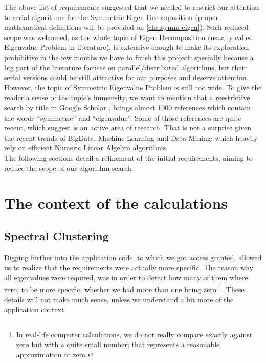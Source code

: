 The above list of requirements suggested that we needed to restrict
our attention to serial algorithms for the Symmetric Eigen
Decomposition (proper mathematical definitions will be provided on
\cref{cha:symm-eigen}). Such reduced scope was welcomed, as the whole
topic of Eigen Decomposition (usually called Eigenvalue Problem in
literature), is extensive enough to make its exploration prohibitive in
the few months we have to finish this project; specially because a big
part of the literature focuses on parallel/distributed algorithms, but
their serial versions could be still attractive for our purposes and
deserve attention. \\

However, the topic of Symmetric Eigenvalue Problem is still too wide. To give
the reader a sense of the topic's immensity, we want to mention that a
reestrictive search by title in Google Scholar
\cite{googlescholar}, brings almost 1000 references which contain the
words ``symmetric'' and ``eigenvalue''. Some of those references
are quite recent, which suggest is an active area of research. That is
not a surprise given the recent trends of BigData, Machine Learning
and Data Mining; which heavily rely on efficient Numeric Linear
Algebra algorithms. \\

The following sections detail a refinement of the initial
requirements, aiming to reduce the scope of our algorithm search. 

\section{The context of the calculations}

\subsection{Spectral Clustering}
Digging further into the application code, to which we got access
granted, allowed us to realize that the requirements were actually
more specific. The reason why all eigenvalues were required, was in
order to detect how many of them where zero; to be more specific,
whether we had more than one being zero \footnote{In real-life
  computer calculations, we do not really compare exactly against
  zero but with a quite small number; that represents a reasonable
  approximation to zero.}. These details
will not make much sense, unless we understand a bit more of the
application context. \\

